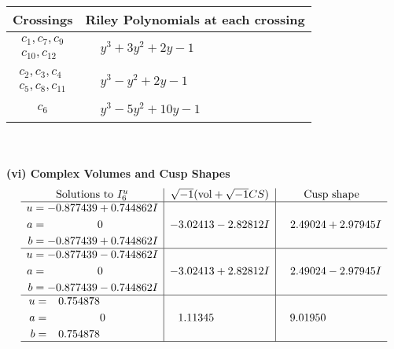 \documentclass[1p]{elsarticle_modified}
\theoremstyle{definition}
\newcommand{\I}{\sqrt{-1}}
\begin{document}
\begin{tabular}{m{50pt}|m{274pt}}
Crossings & \hspace{64pt}Riley Polynomials at each crossing \\
\hline $$\begin{aligned}c_{1},c_{7},c_{9}\\c_{10},c_{12}\end{aligned}$$&$\begin{aligned}
&y^3+3 y^2+2 y-1
\end{aligned}$\\
\hline $$\begin{aligned}c_{2},c_{3},c_{4}\\c_{5},c_{8},c_{11}\end{aligned}$$&$\begin{aligned}
&y^3- y^2+2 y-1
\end{aligned}$\\
\hline $$\begin{aligned}c_{6}\end{aligned}$$&$\begin{aligned}
&y^3-5 y^2+10 y-1
\end{aligned}$\\
\hline
\end{tabular}\\~\\
\newpage\flushleft \textbf{(vi) Complex Volumes and Cusp Shapes}
$$\begin{array}{c|c|c}  
\text{Solutions to }I^u_{6}& \I (\text{vol} + \sqrt{-1}CS) & \text{Cusp shape}\\
 \hline 
\begin{aligned}
u &= -0.877439 + 0.744862 I \\
a &= \phantom{-0.000000 } 0 \\
b &= -0.877439 + 0.744862 I\end{aligned}
 & -3.02413 - 2.82812 I & \phantom{-}2.49024 + 2.97945 I \\ \hline\begin{aligned}
u &= -0.877439 - 0.744862 I \\
a &= \phantom{-0.000000 } 0 \\
b &= -0.877439 - 0.744862 I\end{aligned}
 & -3.02413 + 2.82812 I & \phantom{-}2.49024 - 2.97945 I \\ \hline\begin{aligned}
u &= \phantom{-}0.754878\phantom{ +0.000000I} \\
a &= \phantom{-0.000000 } 0 \\
b &= \phantom{-}0.754878\phantom{ +0.000000I}\end{aligned}
 & \phantom{-}1.11345\phantom{ +0.000000I} & \phantom{-}9.01950\phantom{ +0.000000I}\\
 \hline 
 \end{array}$$\newpage\newpage\renewcommand{\arraystretch}{1}
\end{document}
